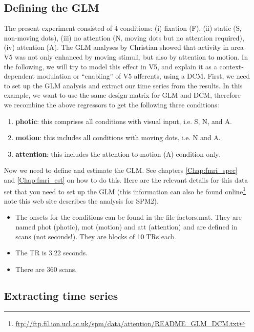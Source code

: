 \subsection{Defining the GLM}
The present experiment consisted of 4 conditions: (i) fixation (F), (ii) static (S, non-moving dots), (iii) no attention (N, moving dots but no attention required), (iv) attention (A). The GLM analyses by Christian showed that activity in area V5 was not only enhanced by moving stimuli, but also by attention to motion.  In the following, we will try to model this effect in V5, and explain it as a context-dependent modulation or ``enabling'' of V5 afferents, using a DCM. First, we need to set up the GLM analysis and extract our time series from the results. In this example, we want to use the same design matrix for GLM and DCM, therefore we recombine the above regressors to get the following three conditions: 
\begin{enumerate}
\item{{\bf photic}: this comprises all conditions with visual input, i.e. S, N, and A.}
\item{{\bf motion}: this includes all conditions with moving dots, i.e. N and A.}
\item{{\bf attention}: this includes the attention-to-motion (A) condition only.}
\end{enumerate}
Now we need to define and estimate the GLM. See chapters \ref{Chap:fmri_spec} and \ref{Chap:fmri_est} on how to do this. Here are the relevant details for this data set that you need to set up the GLM (this information can also be found online\footnote{\url{ftp://ftp.fil.ion.ucl.ac.uk/spm/data/attention/README_GLM_DCM.txt}}
note this web site describes the analysis for SPM2).
\begin{itemize}
\item{The onsets for the conditions can be found in the file factors.mat.  They are named phot (photic), mot (motion) and att (attention) and are defined in scans (not seconds!).  They are blocks of 10 TRs each.}
\item{The TR is 3.22 seconds.}
\item{There are 360 scans.}
\end{itemize}

\subsection{Extracting time series}


